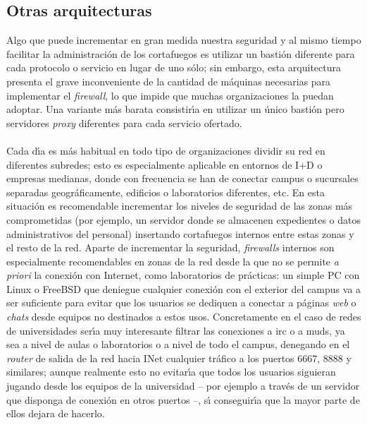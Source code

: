 \subsection{Otras arquitecturas}
Algo que puede incrementar en gran medida nuestra seguridad y al mismo tiempo
facilitar la administraci\'on de los cortafuegos es utilizar un basti\'on
diferente para cada protocolo o servicio en lugar de uno s\'olo; sin embargo,
esta arquitectura presenta el grave inconveniente de la cantidad de m\'aquinas
necesarias para implementar el {\it firewall}, lo que impide que muchas 
organizaciones la puedan adoptar. Una variante m\'as barata consistir\'{\i}a en
utilizar un \'unico basti\'on pero servidores {\it proxy} diferentes para
cada servicio ofertado.\\
\\Cada d\'{\i}a es m\'as habitual en todo tipo de organizaciones 
dividir su red en diferentes subredes; esto es especialmente aplicable en
entornos de I+D o empresas medianas, donde con frecuencia se han de conectar 
campus o sucursales separadas geogr\'aficamente, edificios o laboratorios 
diferentes, etc. En esta situaci\'on
es recomendable incrementar los niveles de seguridad de las zonas m\'as
comprometidas (por ejemplo, un servidor donde se almacenen expedientes o datos
administrativos del personal) insertando cortafuegos internos entre estas zonas
y el resto de la red. Aparte de incrementar la seguridad, {\it firewalls} 
internos son especialmente recomendables en zonas de la red desde la que no se
permite {\it a priori} la conexi\'on con Internet, como laboratorios de
pr\'acticas: un simple PC con Linux o FreeBSD que deniegue cualquier conexi\'on
con el exterior del campus va a ser suficiente para evitar que los usuarios 
se dediquen a conectar a p\'aginas {\it web} o {\it chats} desde equipos no
destinados a estos usos. Concretamente en el caso de redes de universidades 
ser\'{\i}a muy
interesante filtrar las conexiones a {\sc irc} o a {\sc mud}s, ya sea a nivel
de aulas o laboratorios o a nivel de todo el campus, denegando en el {\it 
router} de salida de la red hacia INet cualquier tr\'afico a los puertos 6667,
8888 y similares; aunque realmente esto no evitar\'{\i}a que todos los
usuarios siguieran jugando desde los equipos de la universidad -- por ejemplo 
a trav\'es de un servidor que disponga de conexi\'on en otros puertos --, 
s\'{\i} conseguir\'{\i}a que la mayor parte de ellos dejara de hacerlo.
